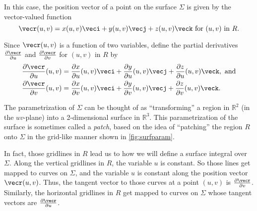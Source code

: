 In this case, the position vector of a point on the surface $\Sigma$ is given by the vector-valued function
\[
 \vecr(u,v) = x(u,v) \veci + y(u,v) \vecj + z(u,v) \veck \text{ for $(u,v)$ in $R$.}
\]

Since $\vecr(u,v)$ is a function of two variables, define the partial derivatives $\frac{\partial \vecr}{\partial u}$ and $\frac{\partial \vecr}{\partial v}$ for $(u,v)$ in $R$ by
\begin{align*}
 \frac{\partial \vecr}{\partial u}(u,v) &=
 \frac{\partial x}{\partial u}(u,v) \veci + \frac{\partial y}{\partial u}(u,v) \vecj +
 \frac{\partial z}{\partial u}(u,v) \veck ,\text{ and}\vspace{1mm}\\
 \frac{\partial \vecr}{\partial v}(u,v) &=
 \frac{\partial x}{\partial v}(u,v) \veci + \frac{\partial y}{\partial v}(u,v) \vecj +
 \frac{\partial z}{\partial v}(u,v) \veck .
\end{align*}

The parametrization of $\Sigma$ can be thought of as ``transforming'' a region in $\mathbb{R}^{2}$ (in the $uv$-plane) into a 2-dimensional surface in $\mathbb{R}^{3}$. This parametrization of the surface is sometimes called a \emph{patch}, based on the idea of ``patching'' the region $R$ onto $\Sigma$ in the grid-like manner shown in \autoref{fig:surfparam}.

In fact, those gridlines in $R$ lead us to how we will define a surface integral over $\Sigma$. Along the vertical gridlines in $R$, the variable $u$ is constant. So those lines get mapped to curves on $\Sigma$, and the variable $u$ is constant along the position vector $\vecr(u,v)$. Thus, the tangent vector to those curves at a point $(u,v)$ is $\frac{\partial \vecr}{\partial v}$. Similarly, the horizontal gridlines in $R$ get mapped to curves on $\Sigma$ whose tangent vectors are $\frac{\partial \vecr}{\partial u}$.

